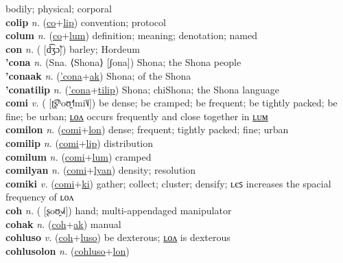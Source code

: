bodily; physical; corporal \label{colilak} \\
\textbf{colip} \textit{n.} (\hyperref[co]{co}+\hyperref[lip]{lip})
convention; protocol \label{colip} \\
\textbf{colum} \textit{n.} (\hyperref[co]{co}+\hyperref[lum]{lum})
definition; meaning; denotation; named \label{colum} \\
\textbf{con} \textit{n.} ( [d͡ʒɔ̃])
barley; Hordeum \label{con} \\
\textbf{'cona} \textit{n.} (Sna. ⟨Shona⟩ [ʃona])
Shona; the Shona people \label{'cona} \\
\textbf{'conaak} \textit{n.} (\hyperref['cona]{'cona}+\hyperref[ak]{ak})
Shona; of the Shona \label{'conaak} \\
\textbf{'conatilip} \textit{n.} (\hyperref['cona]{'cona}+\hyperref[tilip]{tilip})
Shona; chiShona; the Shona language \label{'conatilip} \\
\textbf{comi} \textit{v.} ( [ʈ͡ʂʰoʊ̯˧˥mi˥˩])
be dense; be cramped; be frequent; be tightly packed; be fine; be urban; \hyperref[comilon]{ʟᴏᴧ} occurs frequently and close together in \hyperref[comilum]{ʟᴜᴍ} \label{comi} \\
\textbf{comilon} \textit{n.} (\hyperref[comi]{comi}+\hyperref[lon]{lon})
dense; frequent; tightly packed; fine; urban \label{comilon} \\
\textbf{comilip} \textit{n.} (\hyperref[comi]{comi}+\hyperref[lip]{lip})
distribution \label{comilip} \\
\textbf{comilum} \textit{n.} (\hyperref[comi]{comi}+\hyperref[lum]{lum})
cramped \label{comilum} \\
\textbf{comilyan} \textit{n.} (\hyperref[comi]{comi}+\hyperref[lyan]{lyan})
density; resolution \label{comilyan} \\
\textbf{comiki} \textit{v.} (\hyperref[comi]{comi}+\hyperref[ki]{ki})
gather; collect; cluster; densify; ʟєꜱ increases the spacial frequency of ʟᴏᴧ \label{comiki} \\
\textbf{coh} \textit{n.} ( [ʂoʊ̯˧˩˧])
hand; multi-appendaged manipulator \label{coh} \\
\textbf{cohak} \textit{n.} (\hyperref[coh]{coh}+\hyperref[ak]{ak})
manual \label{cohak} \\
\textbf{cohluso} \textit{v.} (\hyperref[coh]{coh}+\hyperref[luso]{luso})
be dexterous; \hyperref[cohlusolon]{ʟᴏᴧ} is dexterous \label{cohluso} \\
\textbf{cohlusolon} \textit{n.} (\hyperref[cohluso]{cohluso}+\hyperref[lon]{lon})
